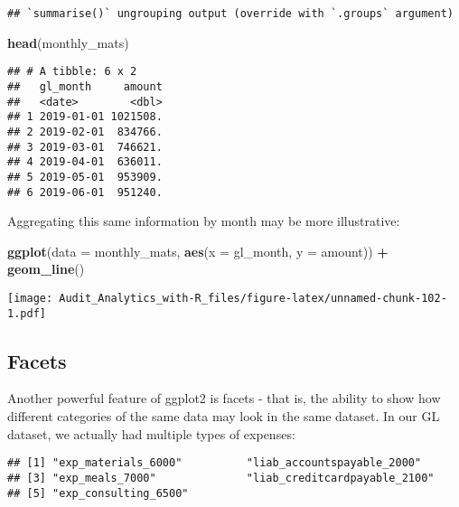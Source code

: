 \documentclass[
]{book}
\newenvironment{Shaded}{\begin{snugshade}}{\end{snugshade}}
\newcommand{\DataTypeTok}[1]{\textcolor[rgb]{0.13,0.29,0.53}{#1}}
\newcommand{\KeywordTok}[1]{\textcolor[rgb]{0.13,0.29,0.53}{\textbf{#1}}}
\newcommand{\NormalTok}[1]{#1}
\newcommand{\OperatorTok}[1]{\textcolor[rgb]{0.81,0.36,0.00}{\textbf{#1}}}
\newcommand{\StringTok}[1]{\textcolor[rgb]{0.31,0.60,0.02}{#1}}
\begin{document}
\begin{verbatim}
## `summarise()` ungrouping output (override with `.groups` argument)
\end{verbatim}

\begin{Shaded}
\begin{Highlighting}[]
\KeywordTok{head}\NormalTok{(monthly_mats)}
\end{Highlighting}
\end{Shaded}

\begin{verbatim}
## # A tibble: 6 x 2
##   gl_month     amount
##   <date>        <dbl>
## 1 2019-01-01 1021508.
## 2 2019-02-01  834766.
## 3 2019-03-01  746621.
## 4 2019-04-01  636011.
## 5 2019-05-01  953909.
## 6 2019-06-01  951240.
\end{verbatim}

Aggregating this same information by month may be more illustrative:

\begin{Shaded}
\begin{Highlighting}[]
\KeywordTok{ggplot}\NormalTok{(}\DataTypeTok{data =}\NormalTok{ monthly_mats, }\KeywordTok{aes}\NormalTok{(}\DataTypeTok{x =}\NormalTok{ gl_month, }\DataTypeTok{y =}\NormalTok{ amount)) }\OperatorTok{+}
\StringTok{  }\KeywordTok{geom_line}\NormalTok{()}
\end{Highlighting}
\end{Shaded}

\texttt{[image: Audit\_Analytics\_with-R\_files/figure-latex/unnamed-chunk-102-1.pdf]}

\hypertarget{facets}{%
\subsection{Facets}\label{facets}}

Another powerful feature of ggplot2 is facets - that is, the ability to show how different categories of the same data may look in the same dataset. In our GL dataset, we actually had multiple types of expenses:

\begin{Shaded}
\end{Shaded}

\begin{verbatim}
## [1] "exp_materials_6000"          "liab_accountspayable_2000"  
## [3] "exp_meals_7000"              "liab_creditcardpayable_2100"
## [5] "exp_consulting_6500"
\end{verbatim}
\end{document}
